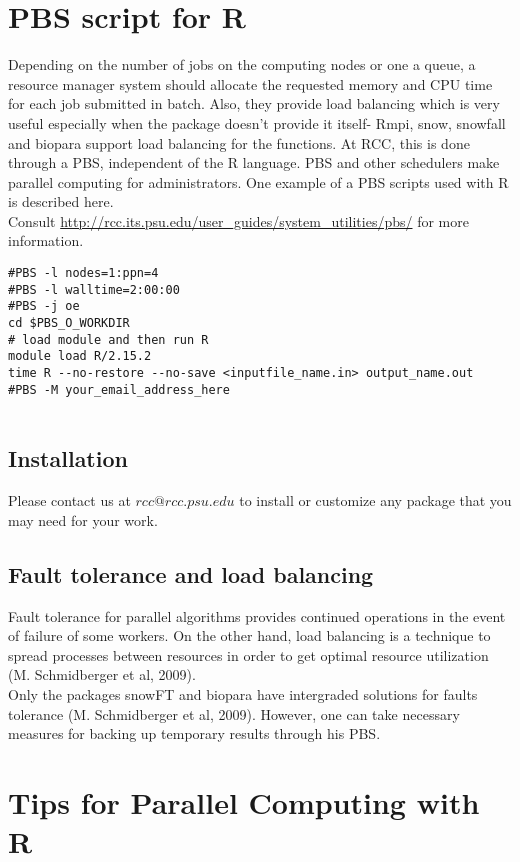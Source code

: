 \documentclass[12pt]{article}
\begin{document}
\section{PBS script for R}
Depending on the number of jobs on the computing nodes or one a queue, a resource manager system should allocate the requested memory and CPU time for each job submitted in batch. Also, they provide  load balancing which is very useful especially when the package doesn’t provide it itself- Rmpi, snow, snowfall and biopara support load balancing for the  functions. At RCC, this is done through a PBS, independent of the R language. PBS and other schedulers make parallel computing for administrators.  One example of a PBS scripts used with R is described here.\\
Consult \url{http://rcc.its.psu.edu/user_guides/system_utilities/pbs/} for more information.
\begin{lstlisting}[label= PBS for R,caption= Sample PBS for R Script]
#PBS -l nodes=1:ppn=4
#PBS -l walltime=2:00:00
#PBS -j oe
cd $PBS_O_WORKDIR
# load module and then run R
module load R/2.15.2
time R --no-restore --no-save <inputfile_name.in> output_name.out
#PBS -M your_email_address_here 
                            
\end{lstlisting}

\subsection*{Installation}
Please contact us at $rcc@rcc.psu.edu$ to install or customize any package that you may need for your work.\\
\subsection*{Fault tolerance and load balancing}
Fault tolerance for parallel algorithms provides continued operations in the event of failure of some workers. On the other hand, load balancing is a technique to spread processes between resources in order to get optimal resource utilization (M. Schmidberger et al, 2009).\\
Only the packages snowFT and biopara have intergraded solutions for faults tolerance (M. Schmidberger et al, 2009). However, one can take necessary measures for backing up temporary results through his PBS.\\

\section{Tips for Parallel Computing with R}
\end{document}
